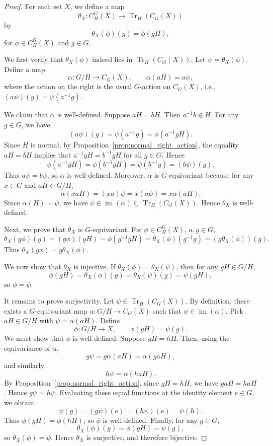 \documentclass{amsart}
\begin{document}
\begin{proof}
For each set $X$, we define a map
\[
\theta_X \colon C_H^G(X) \longrightarrow \operatorname{Tr}_H(C_G(X))
\]
by
\[
\theta_X(\phi)(g) = \phi(gH),
\]
for $\phi \in C_H^G(X)$ and $g \in G$.

We first verify that $\theta_X(\phi)$ indeed lies in $\operatorname{Tr}_H(C_G(X))$. Let $\psi = \theta_X(\phi)$. Define a map
\[
\alpha \colon G/H \longrightarrow C_G(X), \qquad \alpha(aH) = a \psi,
\]
where the action on the right is the usual $G$-action on $C_G(X)$, i.e., $(a \psi)(g) = \psi(a^{-1}g)$.

We claim that $\alpha$ is well-defined. Suppose $aH = bH$. Then $a^{-1}b \in H$. For any $g \in G$, we have
\[
(a \psi)(g) = \psi(a^{-1}g) = \phi(a^{-1}gH).
\]
Since $H$ is normal, by Proposition~\ref{prop:normal_right_action}, the equality $aH = bH$ implies that $a^{-1}gH = b^{-1}gH$ for all $g \in G$. Hence
\[
\phi(a^{-1}gH) = \phi(b^{-1}gH) = \psi(b^{-1}g) = (b \psi)(g).
\]
Thus $a \psi = b \psi$, so $\alpha$ is well-defined. Moreover, $\alpha$ is $G$-equivariant because for any $x \in G$ and $aH \in G/H$,
\[
\alpha(xaH) = (xa) \psi = x (a \psi) = x \alpha(aH).
\]
Since $\alpha(H) = \psi$, we have $\psi \in \operatorname{im}(\alpha) \subseteq \operatorname{Tr}_H(C_G(X))$. Hence $\theta_X$ is well-defined.

Next, we prove that $\theta_X$ is $G$-equivariant. For $\phi \in C_H^G(X)$, $a, g \in G$,
\[
\theta_X(g \phi)(g) = (g \phi)(gH) = \phi(g^{-1}gH) = \theta_X(\phi)(g^{-1}g) = (g \theta_X(\phi))(g).
\]
Thus $\theta_X(g \phi) = g \theta_X(\phi)$.

We now show that $\theta_X$ is injective. If $\theta_X(\phi) = \theta_X(\psi)$, then for any $gH \in G/H$,
\[
\phi(gH) = \theta_X(\phi)(g) = \theta_X(\psi)(g) = \psi(gH),
\]
so $\phi = \psi$.

It remains to prove surjectivity. Let $\psi \in \operatorname{Tr}_H(C_G(X))$. By definition, there exists a $G$-equivariant map $\alpha \colon G/H \longrightarrow C_G(X)$ such that $\psi \in \operatorname{im}(\alpha)$. Pick $aH \in G/H$ with $\psi = \alpha(aH)$. Define
\[
\phi \colon G/H \longrightarrow X, \qquad \phi(gH) = \psi(g).
\]
We must show that $\phi$ is well-defined. Suppose $gH = hH$. Then, using the equivariance of $\alpha$,
\[
g \psi = g \alpha(aH) = \alpha(gaH),
\]
and similarly
\[
h \psi = \alpha(haH).
\]
By Proposition~\ref{prop:normal_right_action}, since $gH = hH$, we have $gaH = haH$. Hence $g \psi = h \psi$. Evaluating these equal functions at the identity element $e \in G$, we obtain
\[
\psi(g) = (g \psi)(e) = (h \psi)(e) = \psi(h).
\]
Thus $\phi(gH) = \phi(hH)$, so $\phi$ is well-defined. Finally, for any $g \in G$,
\[
\theta_X(\phi)(g) = \phi(gH) = \psi(g),
\]
so $\theta_X(\phi) = \psi$. Hence $\theta_X$ is surjective, and therefore bijective.


\end{proof}
\end{document}
